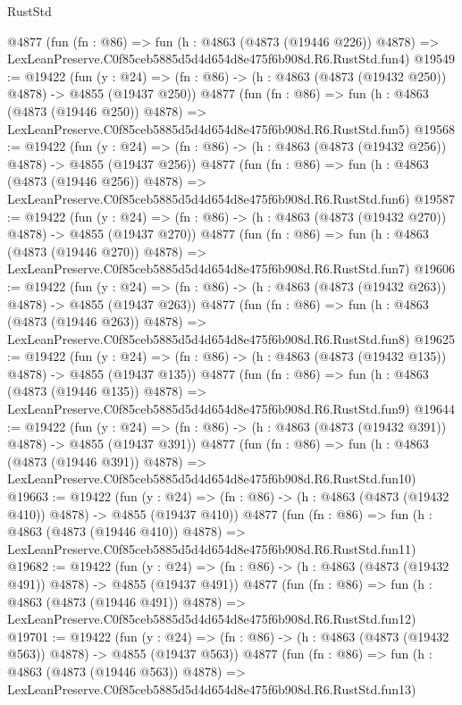 \begin{lexlean}{RustStd}
\begin{coremodule}
    @4877
    (fun (fn : @86) =>
    fun (h : @4863 (@4873 (@19446 @226)) @4878) =>
    LexLeanPreserve.C0f85ceb5885d5d4d654d8e475f6b908d.R6.RustStd.fun4)
@19549 := @19422
    (fun (y : @24) => (fn : @86) -> (h : @4863 (@4873 (@19432 @250)) @4878) -> @4855 (@19437 @250))
    @4877
    (fun (fn : @86) =>
    fun (h : @4863 (@4873 (@19446 @250)) @4878) =>
    LexLeanPreserve.C0f85ceb5885d5d4d654d8e475f6b908d.R6.RustStd.fun5)
@19568 := @19422
    (fun (y : @24) => (fn : @86) -> (h : @4863 (@4873 (@19432 @256)) @4878) -> @4855 (@19437 @256))
    @4877
    (fun (fn : @86) =>
    fun (h : @4863 (@4873 (@19446 @256)) @4878) =>
    LexLeanPreserve.C0f85ceb5885d5d4d654d8e475f6b908d.R6.RustStd.fun6)
@19587 := @19422
    (fun (y : @24) => (fn : @86) -> (h : @4863 (@4873 (@19432 @270)) @4878) -> @4855 (@19437 @270))
    @4877
    (fun (fn : @86) =>
    fun (h : @4863 (@4873 (@19446 @270)) @4878) =>
    LexLeanPreserve.C0f85ceb5885d5d4d654d8e475f6b908d.R6.RustStd.fun7)
@19606 := @19422
    (fun (y : @24) => (fn : @86) -> (h : @4863 (@4873 (@19432 @263)) @4878) -> @4855 (@19437 @263))
    @4877
    (fun (fn : @86) =>
    fun (h : @4863 (@4873 (@19446 @263)) @4878) =>
    LexLeanPreserve.C0f85ceb5885d5d4d654d8e475f6b908d.R6.RustStd.fun8)
@19625 := @19422
    (fun (y : @24) => (fn : @86) -> (h : @4863 (@4873 (@19432 @135)) @4878) -> @4855 (@19437 @135))
    @4877
    (fun (fn : @86) =>
    fun (h : @4863 (@4873 (@19446 @135)) @4878) =>
    LexLeanPreserve.C0f85ceb5885d5d4d654d8e475f6b908d.R6.RustStd.fun9)
@19644 := @19422
    (fun (y : @24) => (fn : @86) -> (h : @4863 (@4873 (@19432 @391)) @4878) -> @4855 (@19437 @391))
    @4877
    (fun (fn : @86) =>
    fun (h : @4863 (@4873 (@19446 @391)) @4878) =>
    LexLeanPreserve.C0f85ceb5885d5d4d654d8e475f6b908d.R6.RustStd.fun10)
@19663 := @19422
    (fun (y : @24) => (fn : @86) -> (h : @4863 (@4873 (@19432 @410)) @4878) -> @4855 (@19437 @410))
    @4877
    (fun (fn : @86) =>
    fun (h : @4863 (@4873 (@19446 @410)) @4878) =>
    LexLeanPreserve.C0f85ceb5885d5d4d654d8e475f6b908d.R6.RustStd.fun11)
@19682 := @19422
    (fun (y : @24) => (fn : @86) -> (h : @4863 (@4873 (@19432 @491)) @4878) -> @4855 (@19437 @491))
    @4877
    (fun (fn : @86) =>
    fun (h : @4863 (@4873 (@19446 @491)) @4878) =>
    LexLeanPreserve.C0f85ceb5885d5d4d654d8e475f6b908d.R6.RustStd.fun12)
@19701 := @19422
    (fun (y : @24) => (fn : @86) -> (h : @4863 (@4873 (@19432 @563)) @4878) -> @4855 (@19437 @563))
    @4877
    (fun (fn : @86) =>
    fun (h : @4863 (@4873 (@19446 @563)) @4878) =>
    LexLeanPreserve.C0f85ceb5885d5d4d654d8e475f6b908d.R6.RustStd.fun13)

\end{coremodule}
\end{lexlean}
